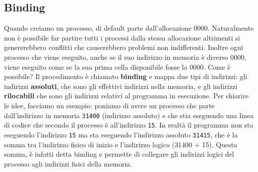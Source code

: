 % 
\subsection{Binding}
Quando creiamo un processo, di default parte dall'allocazione 0000. Naturalmente non è possibile far partire tutti i processi dalla stessa allocazione altrimenti si genererebbero conflitti che causerebbero problemi non indifferenti. Inoltre ogni processo che viene eseguito, anche se il suo indirizzo in memoria è diverso 0000, viene eseguito come se la sua prima cella disponibile fosse la 0000. Come è possibile? Il procedimento è chiamato \textbf{binding} e mappa due tipi di indirizzi: gli indirizzi \textbf{assoluti}, che sono gli effettivi indirizzi nella memoria, e gli indirizzi \textbf{rilocabili} che sono gli indirizzi relativi al programma in esecuzione. Per chiarire le idee, facciamo un esempio: poniamo di avere un processo che parte dall'indirizzo in memoria \texttt{31400} (indirizzo assoluto) e che stia eseguendo una linea di codice che secondo il processo è all'indirizzo \texttt{15}. In realtà il programma non sta eseguendo l'indirizzo \texttt{15} ma sta eseguendo l'indirizzo assoluto \texttt{31415}, che è la somma tra l'indirizzo fisico di inizio e l'indirizzo logico (31400 + 15). Questa somma, è infatti detta binding e permette di collegare gli indirizzi logici del processo agli indirizzi fisici della memoria. 

